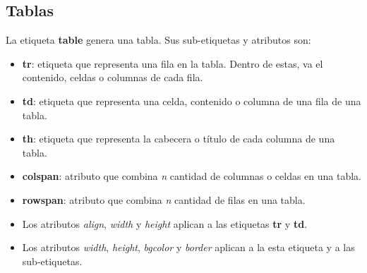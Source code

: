 \subsection{Tablas}

La etiqueta \textbf{table} genera una tabla. Sus sub-etiquetas y atributos son:
\begin{itemize}
    \item \textbf{tr}: etiqueta que representa una fila en la tabla. Dentro de estas, va el contenido, celdas o columnas de cada fila.
    \item \textbf{td}: etiqueta que representa una celda, contenido o columna de una fila de una tabla.
    \item \textbf{th}: etiqueta que representa la cabecera o título de cada columna de una tabla.
    \item \textbf{colspan}: atributo que combina \textit{n} cantidad de columnas o celdas en una tabla.
    \item \textbf{rowspan}: atributo que combina \textit{n} cantidad de filas en una tabla.
    \item Los atributos \textit{align}, \textit{width} y \textit{height} aplican a las etiquetas \textbf{tr} y \textbf{td}.
    \item Los atributos \textit{width}, \textit{height}, \textit{bgcolor} y \textit{border} aplican a la esta etiqueta y a las sub-etiquetas.
\end{itemize}

